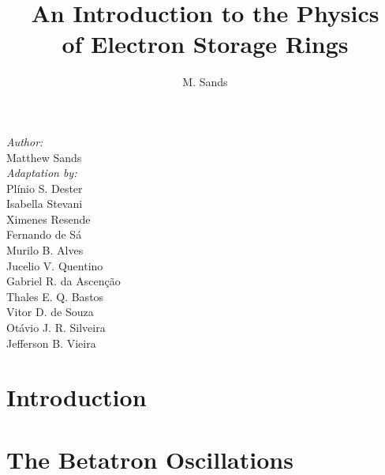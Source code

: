 \documentclass[ebook,a4paper,12pt,oneside,openany]{memoir}
\title{An Introduction to the Physics\\ of Electron Storage Rings}
\author{M. Sands}
\numberwithin{equation}{chapter}
\begin{document}
\maketitle
\vspace{30mm}
\begin{flushright}
    \textit{Author:} \\
    \vspace{1mm}
        Matthew Sands \\
    \vspace{5mm}
    \textit{Adaptation by:} \\
    \vspace{1mm}
	Pl\'inio S. Dester \\
	Isabella Stevani \\
	Ximenes Resende \\
  Fernando de S\'a \\
  Murilo B. Alves \\
    Jucelio V. Quentino \\
    Gabriel R. da Ascenção \\
    Thales E. Q. Bastos \\
    Vitor D. de Souza \\
    Otávio J. R. Silveira \\
    Jefferson B. Vieira
\end{flushright}

\thispagestyle{empty}

\newpage
\tableofcontents

\newpage


\chapter{Introduction} \label{ch:1}
    
    
    

\chapter{The Betatron Oscillations} \label{ch:2}
    
    
    
    
    
    
    
    
    
    
    
    
\end{document}
